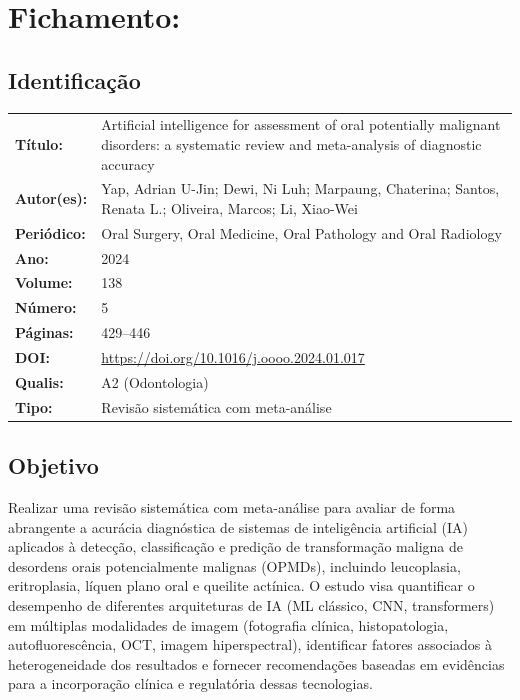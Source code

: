 \section{Fichamento: }

\subsection{Identificação}
\begin{tabular}{ll}
\textbf{Título:} & Artificial intelligence for assessment of oral
potentially malignant disorders: a systematic review and meta-analysis
of diagnostic accuracy \\
\textbf{Autor(es):} & Yap, Adrian U-Jin; Dewi, Ni Luh; Marpaung,
Chaterina; Santos, Renata L.; Oliveira, Marcos; Li, Xiao-Wei \\
\textbf{Periódico:} & Oral Surgery, Oral Medicine, Oral Pathology and Oral Radiology \\
\textbf{Ano:} & 2024 \\
\textbf{Volume:} & 138 \\
\textbf{Número:} & 5 \\
\textbf{Páginas:} & 429--446 \\
\textbf{DOI:} & \url{https://doi.org/10.1016/j.oooo.2024.01.017} \\
\textbf{Qualis:} & A2 (Odontologia) \\
\textbf{Tipo:} & Revisão sistemática com meta-análise \\
\end{tabular}

\subsection{Objetivo}
Realizar uma revisão sistemática com meta-análise para avaliar de forma
abrangente a acurácia diagnóstica de sistemas de inteligência artificial
(IA) aplicados à detecção, classificação e predição de transformação
maligna de desordens orais potencialmente malignas (OPMDs), incluindo
leucoplasia, eritroplasia, líquen plano oral e queilite actínica. O
estudo visa quantificar o desempenho de diferentes arquiteturas de IA
(ML clássico, CNN, transformers) em múltiplas modalidades de imagem
(fotografia clínica, histopatologia, autofluorescência, OCT, imagem
hiperspectral), identificar fatores associados à heterogeneidade dos
resultados e fornecer recomendações baseadas em evidências para a
incorporação clínica e regulatória dessas tecnologias.

